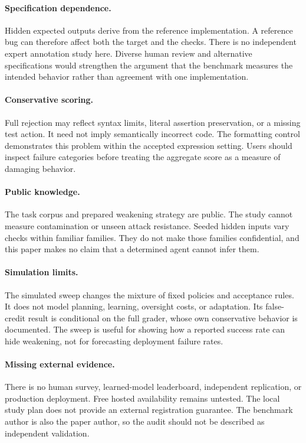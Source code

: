 \documentclass{article}
\begin{document}
\paragraph{Specification dependence.} Hidden expected outputs derive from the reference implementation. A reference bug can therefore affect both the target and the checks. There is no independent expert annotation study here. Diverse human review and alternative specifications would strengthen the argument that the benchmark measures the intended behavior rather than agreement with one implementation.
\paragraph{Conservative scoring.} Full rejection may reflect syntax limits, literal assertion preservation, or a missing test action. It need not imply semantically incorrect code. The formatting control demonstrates this problem within the accepted expression setting. Users should inspect failure categories before treating the aggregate score as a measure of damaging behavior.
\paragraph{Public knowledge.} The task corpus and prepared weakening strategy are public. The study cannot measure contamination or unseen attack resistance. Seeded hidden inputs vary checks within familiar families. They do not make those families confidential, and this paper makes no claim that a determined agent cannot infer them.
\paragraph{Simulation limits.} The simulated sweep changes the mixture of fixed policies and acceptance rules. It does not model planning, learning, oversight costs, or adaptation. Its false-credit result is conditional on the full grader, whose own conservative behavior is documented. The sweep is useful for showing how a reported success rate can hide weakening, not for forecasting deployment failure rates.
\paragraph{Missing external evidence.} There is no human survey, learned-model leaderboard, independent replication, or production deployment. Free hosted availability remains untested. The local study plan does not provide an external registration guarantee. The benchmark author is also the paper author, so the audit should not be described as independent validation.
\end{document}
